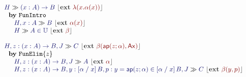 \documentclass[11pt]{article}
\theoremstyle{definition}
\theoremstyle{remark}
\numberwithin{equation}{section}
\def\IModeColorName{MidnightBlue}
\def\OModeColorName{Maroon}
\newcommand\IMode[1]{{\color{\IModeColorName}{#1}}}
\newcommand\OMode[1]{{\color{\OModeColorName}{#1}}}
\newcommand\MemberUnmoded[2]{#1\in #2}
\newcommand\EqMemberUnmoded[3]{#1 = #2\in #3}
\newcommand\DFunIntroRule{\mathtt{FunIntro}}
\newcommand\DFunElimRule[1]{\mathtt{FunElim}\{#1\}}
\newcommand\TyDFun[3]{(#2:#1) \to #3}
\newcommand\Lam[2]{\lambda(#1.#2)}
\newcommand\Ap[2]{\mathsf{ap}(#1;#2)}
\newcommand\Ax{\mathsf{Ax}}
\newcommand\TyUniv{\mathbb{U}}
\newcommand\Subst[3]{\left[#1\;/\;#2\right]#3}
\newcommand\Seq[2]{#1 \gg #2}
\newcommand\Ext[1]{{\color{dark-gray}\left\lfloor\mathbf{ext}\ \OMode{#1}\right\rfloor}}
\newcommand\SeqExt[3]{
  \Seq{\IMode{#1}}{\IMode{#2}}\ \Ext{#3}
}
\newcommand\NuprlRule[3]{%
  \begin{array}{l}%
    #2\\
    \ \ \mathbf{by}\ #1\\
    \quad #3
  \end{array}%
}
\begin{document}
\[
  \begin{array}{l}
    \NuprlRule{\DFunIntroRule}{
      \SeqExt{H}{\TyDFun{A}{x}{B}}{\Lam{x}{\alpha(x)}}
    }{
      \begin{array}{l}
        \SeqExt{H,x:A}{B}{\alpha(x)}\\
        \SeqExt{H}{\MemberUnmoded{A}{\TyUniv}}{\beta}
      \end{array}
    }\\\\
    \NuprlRule{\DFunElimRule{z}}{
      \SeqExt{
        H,z:\TyDFun{A}{x}{B},J
      }{C}{
        \beta(\Ap{z}{\alpha}, \Ax)
      }
    }{
      \begin{array}{l}
        \SeqExt{H,z:\TyDFun{A}{x}{B}, J}{A}{\alpha}\\
        \SeqExt{
          H,z:\TyDFun{A}{x}{B},%
          y:\Subst{\alpha}{x}{B},%
          p:\EqMemberUnmoded{y}{\Ap{z}{\alpha}}{\Subst{\alpha}{x}{B}}, J
        }{C}{
          \beta(y,p)
        }
      \end{array}
    }
  \end{array}
\]
\end{document}
